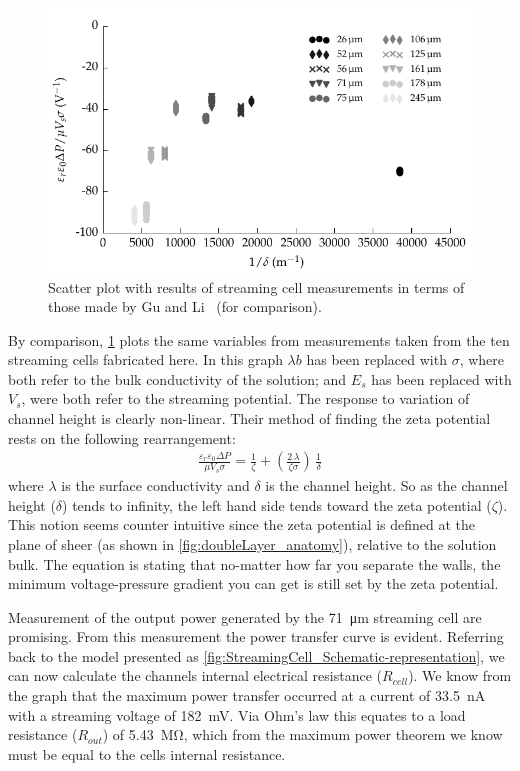 \begin{figure}
    \centering
    \includegraphics{content/pt1/01-PowerHarvesting/graphics/graph_streamingComparison_gu}
    \caption{\label{fig:streamingCell_scatter_Gu_Li}Scatter plot with results of streaming cell measurements in terms of those made by Gu and Li~\cite{Gu2000} (for comparison).}
\end{figure}

By comparison, \cref{fig:streamingCell_scatter_Gu_Li} plots the same variables from measurements taken from the ten streaming cells fabricated here.
In this graph $\lambda{b}$ has been replaced with $\sigma$, where both refer to the bulk conductivity of the solution; and $E_{s}$ has been replaced with $V_{s}$, were both refer to the streaming potential.
The response to variation of channel height is clearly non-linear.
Their method of finding the zeta potential rests on the following rearrangement:
\begin{eqnarray}
    \frac{\varepsilon_{r}\varepsilon_{0}\Delta P}{\mu V_{s}\sigma} = \frac{1}{\zeta} + \left( \frac{2\,\lambda}{\zeta \sigma}\right)\,\frac{1}{\delta}
\end{eqnarray}
where $\lambda$ is the surface conductivity and $\delta$ is the channel height.
So as the channel height ($\delta$) tends to infinity, the left hand side tends toward the zeta potential ($\zeta$).
This notion seems counter intuitive since the zeta potential is defined at the plane of sheer (as shown in \cref{fig:doubleLayer_anatomy}), relative to the solution bulk.
The equation is stating that no-matter how far you separate the walls, the minimum voltage-pressure gradient you can get is still set by the zeta potential.

Measurement of the output power generated by the \SI{71}{\micro\meter} streaming cell are promising.
From this measurement the power transfer curve is evident.
Referring back to the model presented as \cref{fig:StreamingCell_Schematic-representation}, we can now calculate the channels internal electrical resistance ($R_{cell}$).
We know from the graph that the maximum power transfer occurred at a current of \SI{33.5}{\nano\ampere} with a streaming voltage of \SI{182}{\milli\volt}.
Via Ohm's law this equates to a load resistance ($R_{out}$) of \SI{5.43}{\mega\ohm}, which from the maximum power theorem we know must be equal to the cells internal resistance.




